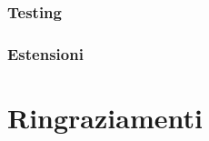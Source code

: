 \documentclass[12pt,a4paper,openright,twoside]{report}
\begin{document}
\subsection{Testing}
\subsection{Estensioni}







\clearpage{\pagestyle{empty}\cleardoublepage}	%


\chapter*{Ringraziamenti}

\thispagestyle{empty}

\end{document}
